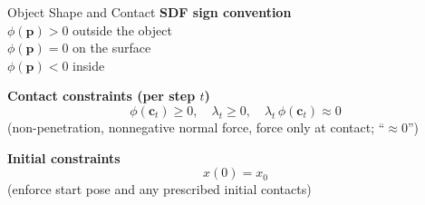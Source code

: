 \documentclass[10pt, aspectratio=169]{beamer}
\begin{document}
\begin{frame}{Object Shape and Contact}
      \textbf{SDF sign convention} \\
      $\phi(\mathbf{p}) > 0$ outside the object \\
      $\phi(\mathbf{p}) = 0$ on the surface \\
      $\phi(\mathbf{p}) < 0$ inside
      \vspace{1.5em}
      
      \textbf{Contact constraints (per step $t$)}
      \[
        \phi(\mathbf{c}_t) \ge 0,\quad
        \lambda_t \ge 0,\quad
        \lambda_t\,\phi(\mathbf{c}_t) \approx 0
      \]
      {\footnotesize (non-penetration, nonnegative normal force, force only at contact; “$\approx 0$”)}
      \vspace{1.5em}
      
      \textbf{Initial constraints}
      \[ x(0) = {x}_0 \]
      {\footnotesize (enforce start pose and any prescribed initial contacts)}
\end{frame}
\end{document}
